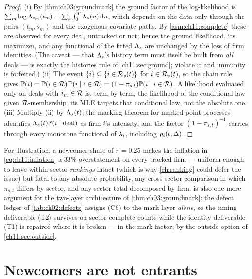 \begin{proof}
(i) By \cref{thm:ch03:groundmark} the ground factor of the log-likelihood
is $\sum_m \log \Lambda_{s_m}(t_m) - \sum_s \int_0^{T} \Lambda_s(u)\,\mathrm{d} u$,
which depends on the data only through the pairs $(t_m, s_m)$ and the
exogenous covariate paths. By \cref{asm:ch11:complete} these are observed
for every deal, untracked or not; hence the ground likelihood, its
maximizer, and any functional of the fitted $\Lambda_s$ are unchanged by the
loss of firm identities. (The caveat --- that $\Lambda_s$'s history term must
itself be built from \emph{all} deals --- is exactly the histories rule of
\cref{ch11:sec:ground}; violate it and immunity is forfeited.)
(ii) The event $\{i\} \subseteq \{i \in \mathcal{R}_s(t)\}$ for
$i \in \mathcal{R}_s(t)$, so the chain rule gives
$\mathbb{P}(i) = \mathbb{P}(i \in \mathcal{R})\,\mathbb{P}(i \mid i \in \mathcal{R})
= (1-\pi_{s,t}) \mathbb{P}(i \mid i \in \mathcal{R})$. A likelihood evaluated only
on deals with $i_m \in \mathcal{R}$ is, term by term, the likelihood of the
conditional law given $\mathcal{R}$-membership; its MLE targets that
conditional law, not the absolute one.
(iii) Multiply (ii) by $\Lambda_s(t)$; the marking theorem for marked point
processes \citep[Ch.~6]{daley2003} identifies
$\Lambda_s(t)\mathbb{P}(i\mid\mathrm{deal})$ as firm $i$'s intensity, and the
factor $(1-\pi_{s,t})^{-1}$ carries through every monotone functional of
$\lambda_i$, including $p_i(t,\Delta)$.
\end{proof}

For illustration, a newcomer share of $\pi = 0.25$ makes the inflation
in \cref{eq:ch11:inflation} a $33\%$ overstatement on every tracked
firm --- uniform enough to leave within-sector \emph{rankings} intact
(which is why \cref{ch:ranking} could defer the issue) but fatal to any
absolute probability, any cross-sector comparison in which $\pi_{s,t}$
differs by sector, and any sector total decomposed by firm.
 is also one more argument for the two-layer
architecture of \cref{thm:ch03:groundmark}: the defect ledger of
\cref{tab:ch02:defects} assigns (C6) to the mark layer \emph{alone},
so the timing deliverable (T2) survives on sector-complete counts while
the identity deliverable (T1) is repaired where it is broken --- in the
mark factor, by the outside option of \cref{ch11:sec:outside}.

\section{Newcomers are not entrants}\label{ch11:sec:newcomer}

